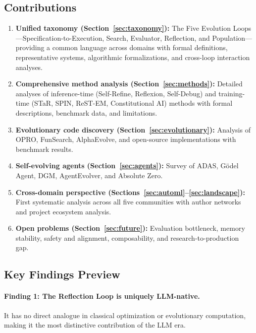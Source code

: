 \subsection{Contributions}
\label{sec:contributions}

\begin{enumerate}
    \item \textbf{Unified taxonomy (Section~\ref{sec:taxonomy}):} The Five Evolution Loops---Specification-to-Execution, Search, Evaluator, Reflection, and Population---providing a common language across domains with formal definitions, representative systems, algorithmic formalizations, and cross-loop interaction analyses.
    \item \textbf{Comprehensive method analysis (Section~\ref{sec:methods}):} Detailed analyses of inference-time (Self-Refine, Reflexion, Self-Debug) and training-time (STaR, SPIN, ReST-EM, Constitutional AI) methods with formal descriptions, benchmark data, and limitations.
    \item \textbf{Evolutionary code discovery (Section~\ref{sec:evolutionary}):} Analysis of OPRO, FunSearch, AlphaEvolve, and open-source implementations with benchmark results.
    \item \textbf{Self-evolving agents (Section~\ref{sec:agents}):} Survey of ADAS, G\"odel Agent, DGM, AgentEvolver, and Absolute Zero.
    \item \textbf{Cross-domain perspective (Sections~\ref{sec:automl}--\ref{sec:landscape}):} First systematic analysis across all five communities with author networks and project ecosystem analysis.
    \item \textbf{Open problems (Section~\ref{sec:future}):} Evaluation bottleneck, memory stability, safety and alignment, composability, and research-to-production gap.
\end{enumerate}


\subsection{Key Findings Preview}
\label{sec:key_findings}

\paragraph{Finding 1: The Reflection Loop is uniquely LLM-native.} It has no direct analogue in classical optimization or evolutionary computation, making it the most distinctive contribution of the LLM era.

